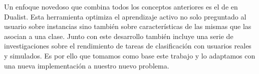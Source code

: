 Un enfoque novedoso que combina todos los conceptos anteriores es el de \citet{dualist} en Dualist. Esta herramienta optimiza el aprendizaje activo no solo preguntado al usuario sobre instancias sino también sobre características de las mismas que las asocian a una clase. Junto con este desarrollo también incluye una serie de investigaciones sobre el rendimiento de tareas de clasificación con usuarios reales y simulados. Es por ello que tomamos como base este trabajo y lo adaptamos con una nueva implementación a nuestro nuevo problema.
